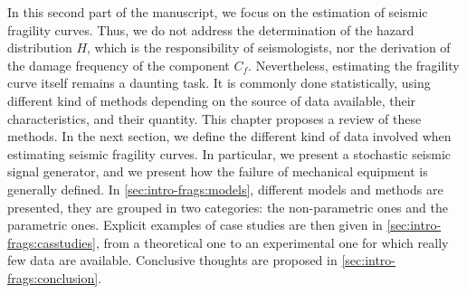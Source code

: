 In this second part of the manuscript, we focus on the estimation of seismic fragility curves. 
Thus, we do not address the determination of the hazard distribution $H$, which is the responsibility of seismologists, 
nor the derivation of the damage frequency of the component $C_f$.
Nevertheless, estimating the fragility curve itself %
remains a daunting task. It is commonly done statistically, using different kind of methods depending 
on the source of data available, their characteristics, and their quantity.
This chapter proposes a review of these methods. 
In the next section,
we define the different kind of data involved when estimating seismic fragility curves. In particular, we present a stochastic seismic signal generator, and  we present how the failure of mechanical equipment is generally defined.
In \cref{sec:intro-frags:models}, different models and methods are presented, they are grouped in two categories: the non-parametric ones and the parametric ones.
Explicit examples of case studies are then given in \cref{sec:intro-frags:casstudies}, from a theoretical one to an experimental one for which really few data are available.
Conclusive thoughts are proposed in \cref{sec:intro-frags:conclusion}.











%
%










